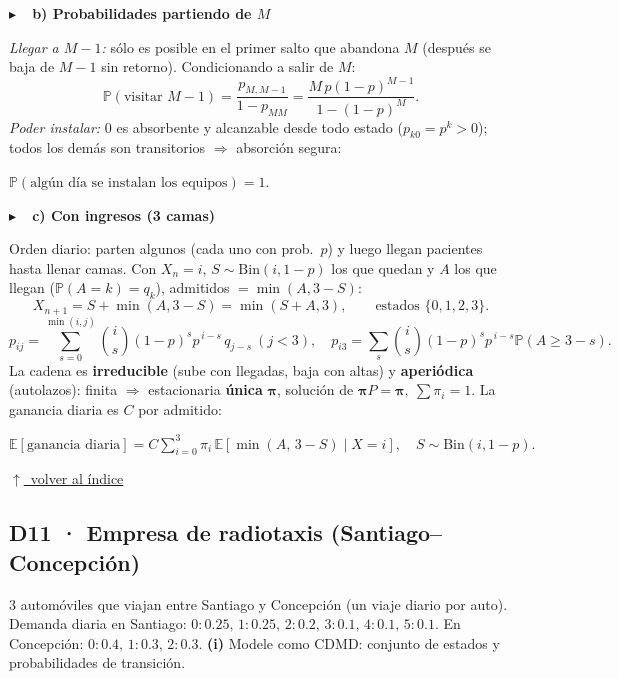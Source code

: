 \documentclass[11pt,a4paper]{article}
\newcommand{\Prob}[1]{\mathbb{P}\!\left(#1\right)}
\newcommand{\E}[1]{\mathbb{E}\!\left[#1\right]}
\newcommand{\paso}[1]{%
  \par\addvspace{9pt}\needspace{2.4cm}\noindent
  {\sffamily\bfseries\color{primary}$\blacktriangleright$\ \ #1}\par\nobreak
  \vspace{2pt}\noindent{\color{primary!22}\rule{\linewidth}{0.8pt}}\par\nobreak\vspace{5pt}%
}
\newcommand{\volver}{%
  \par\vspace{6pt}\hfill{\footnotesize\sffamily\hyperlink{indice}{$\uparrow$\ volver al índice}}\par
  \vspace{1pt}{\color{primary!28}\rule{\linewidth}{1.3pt}}\par\addvspace{16pt}%
}
\begin{document}
\paso{b) Probabilidades partiendo de $M$}
\emph{Llegar a $M-1$:} sólo es posible en el primer salto que abandona $M$ (después se baja
de $M-1$ sin retorno). Condicionando a salir de $M$:
\[
  \Prob{\text{visitar }M-1}=\frac{p_{M,M-1}}{1-p_{MM}}
  =\frac{M\,p(1-p)^{M-1}}{1-(1-p)^{M}}.
\]
\emph{Poder instalar:} $0$ es absorbente y alcanzable desde todo estado ($p_{k0}=p^{k}>0$);
todos los demás son transitorios $\Rightarrow$ absorción segura:
\begin{resultado}
$\displaystyle \Prob{\text{algún día se instalan los equipos}}=\boxed{1}.$
\end{resultado}

\paso{c) Con ingresos (3 camas)}
Orden diario: parten algunos (cada uno con prob.\ $p$) y luego llegan pacientes hasta llenar
camas. Con $X_n=i$, $S\sim\mathrm{Bin}(i,1-p)$ los que quedan y $A$ los que llegan
($\Prob{A=k}=q_k$), admitidos $=\min(A,3-S)$:
\[
  X_{n+1}=S+\min(A,3-S)=\min(S+A,3),\qquad \text{estados }\{0,1,2,3\}.
\]
\[
  p_{ij}=\sum_{s=0}^{\min(i,j)}\binom{i}{s}(1-p)^{s}p^{\,i-s}\,q_{j-s}\ (j<3),\quad
  p_{i3}=\sum_{s}\binom{i}{s}(1-p)^{s}p^{\,i-s}\Prob{A\ge3-s}.
\]
La cadena es \textbf{irreducible} (sube con llegadas, baja con altas) y \textbf{aperiódica}
(autolazos): finita $\Rightarrow$ estacionaria \textbf{única} $\boldsymbol\pi$, solución de
$\boldsymbol\pi P=\boldsymbol\pi,\ \sum\pi_i=1$. La ganancia diaria es $C$ por admitido:
\begin{resultado}
$\displaystyle \E{\text{ganancia diaria}}=C\sum_{i=0}^{3}\pi_i\,
\E{\min(A,\,3-S)\mid X=i},\quad S\sim\mathrm{Bin}(i,1-p).$
\end{resultado}
\volver

\subsection{D11 · Empresa de radiotaxis (Santiago–Concepción)}

\begin{enun}
$3$ automóviles que viajan entre Santiago y Concepción (un viaje diario por auto). Demanda
diaria en Santiago: $0{:}0.25,\,1{:}0.25,\,2{:}0.2,\,3{:}0.1,\,4{:}0.1,\,5{:}0.1$. En
Concepción: $0{:}0.4,\,1{:}0.3,\,2{:}0.3$.
\textbf{(i)} Modele como CDMD: conjunto de estados y probabilidades de transición.
\end{enun}
\end{document}
